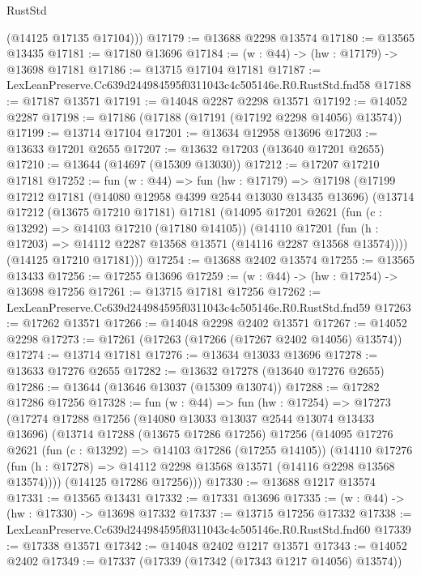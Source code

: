\begin{lexlean}{RustStd}
\begin{coremodule}
        (@14125 @17135 @17104)))
@17179 := @13688 @2298 @13574
@17180 := @13565 @13435
@17181 := @17180 @13696
@17184 := (w : @44) -> (hw : @17179) -> @13698 @17181
@17186 := @13715 @17104 @17181
@17187 := LexLeanPreserve.Cc639d244984595f0311043c4c505146e.R0.RustStd.fnd58
@17188 := @17187 @13571
@17191 := @14048 @2287 @2298 @13571
@17192 := @14052 @2287
@17198 := @17186 (@17188 (@17191 (@17192 @2298 @14056) @13574))
@17199 := @13714 @17104
@17201 := @13634 @12958 @13696
@17203 := @13633 @17201 @2655
@17207 := @13632 @17203 (@13640 @17201 @2655)
@17210 := @13644 (@14697 (@15309 @13030))
@17212 := @17207 @17210 @17181
@17252 := fun (w : @44) =>
  fun (hw : @17179) =>
  @17198
    (@17199
      @17212
      @17181
      (@14080 @12958 @4399 @2544 @13030 @13435 @13696)
      (@13714
        @17212
        (@13675 @17210 @17181)
        @17181
        (@14095
          @17201
          @2621
          (fun (c : @13292) => @14103 @17210 (@17180 @14105))
          (@14110
            @17201
            (fun (h : @17203) => @14112 @2287 @13568 @13571 (@14116 @2287 @13568 @13574))))
        (@14125 @17210 @17181)))
@17254 := @13688 @2402 @13574
@17255 := @13565 @13433
@17256 := @17255 @13696
@17259 := (w : @44) -> (hw : @17254) -> @13698 @17256
@17261 := @13715 @17181 @17256
@17262 := LexLeanPreserve.Cc639d244984595f0311043c4c505146e.R0.RustStd.fnd59
@17263 := @17262 @13571
@17266 := @14048 @2298 @2402 @13571
@17267 := @14052 @2298
@17273 := @17261 (@17263 (@17266 (@17267 @2402 @14056) @13574))
@17274 := @13714 @17181
@17276 := @13634 @13033 @13696
@17278 := @13633 @17276 @2655
@17282 := @13632 @17278 (@13640 @17276 @2655)
@17286 := @13644 (@13646 @13037 (@15309 @13074))
@17288 := @17282 @17286 @17256
@17328 := fun (w : @44) =>
  fun (hw : @17254) =>
  @17273
    (@17274
      @17288
      @17256
      (@14080 @13033 @13037 @2544 @13074 @13433 @13696)
      (@13714
        @17288
        (@13675 @17286 @17256)
        @17256
        (@14095
          @17276
          @2621
          (fun (c : @13292) => @14103 @17286 (@17255 @14105))
          (@14110
            @17276
            (fun (h : @17278) => @14112 @2298 @13568 @13571 (@14116 @2298 @13568 @13574))))
        (@14125 @17286 @17256)))
@17330 := @13688 @1217 @13574
@17331 := @13565 @13431
@17332 := @17331 @13696
@17335 := (w : @44) -> (hw : @17330) -> @13698 @17332
@17337 := @13715 @17256 @17332
@17338 := LexLeanPreserve.Cc639d244984595f0311043c4c505146e.R0.RustStd.fnd60
@17339 := @17338 @13571
@17342 := @14048 @2402 @1217 @13571
@17343 := @14052 @2402
@17349 := @17337 (@17339 (@17342 (@17343 @1217 @14056) @13574))

\end{coremodule}
\end{lexlean}
